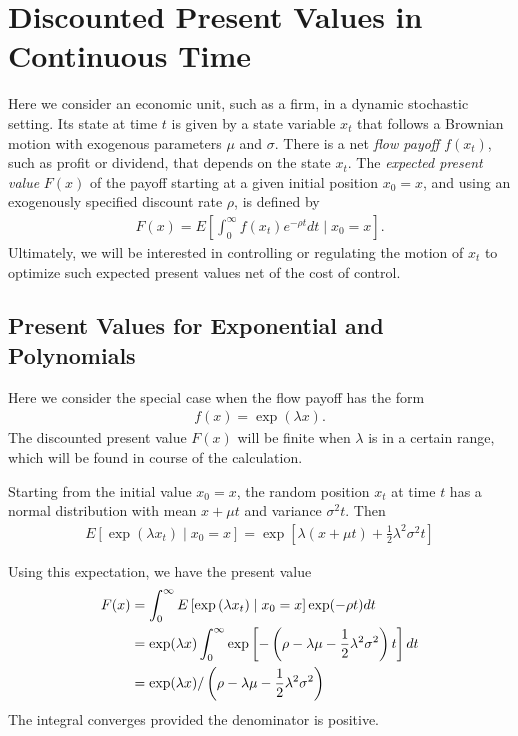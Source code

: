 \documentclass[\topdir/lecture\_notes.tex]{subfiles}
\begin{document}
\section{Discounted Present Values in Continuous Time}
Here we consider an economic unit, such as a firm, in a dynamic stochastic setting. Its state at time $t$ is given by a state variable $x_{t}$ that follows a Brownian motion with exogenous parameters $\mu$ and $\sigma$. There is a net \emph{flow payoff} $f(x_{t})$, such as profit or dividend, that depends on the state $x_{t}$. The \emph{expected present value} $F(x)$ of the payoff starting at a given initial position $x_{0}=x$, and using an exogenously specified discount rate $\rho$, is defined by
\begin{align}
F(x)=E\left[\int_{0}^{\infty} f(x_{t}) e^{-\rho t} dt \mid x_{0}=x\right]. \label{eq: 2.1}
\end{align}
Ultimately, we will be interested in controlling or regulating the motion of $x_{t}$ to optimize such expected present values net of the cost of control.

\subsection{Present Values for Exponential and Polynomials}
Here we consider the special case when the flow payoff has the form
\begin{align*}
f(x)=\exp (\lambda x).
\end{align*}
The discounted present value $F(x)$ will be finite when $\lambda$ is in a certain range, which will be found in course of the calculation.

Starting from the initial value $x_{0}=x$, the random position $x_{t}$ at time $t$ has a normal distribution with mean $x+\mu t$ and variance $\sigma^{2} t$. Then
\begin{align*}
E\left[\exp (\lambda x_{t}) \mid x_{0}=x\right]=\exp \left[\lambda(x+\mu t)+\frac{1}{2} \lambda^{2} \sigma^{2} t\right]
\end{align*}

Using this expectation, we have the present value
\begin{align}
F(x) & =\int_{0}^{\infty} E\left[\exp \left(\lambda x_{t}\right) \mid x_{0}=x\right] \exp (-\rho t) dt \notag \\
& =\exp (\lambda x) \int_{0}^{\infty} \exp \left[-\left(\rho-\lambda \mu-\frac{1}{2} \lambda^{2} \sigma^{2}\right) t\right] dt \notag \\
& =\exp (\lambda x) /\left(\rho-\lambda \mu-\frac{1}{2} \lambda^{2} \sigma^{2}\right)
\label{eq: 2.3}
\end{align}
The integral converges provided the denominator is positive.
\end{document}
